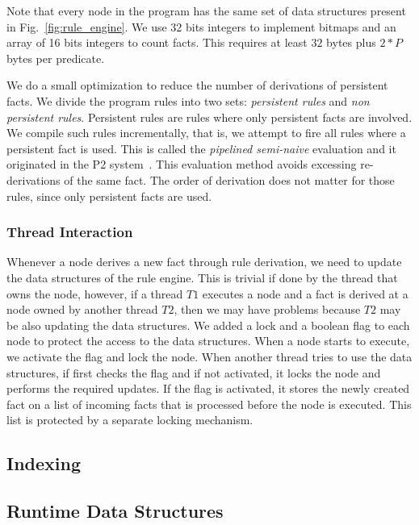 Note that every node in the program has the same set of data structures present in Fig.~\ref{fig:rule_engine}.
We use 32 bits integers to implement bitmaps and an array of 16 bits integers to count facts. This requires
at least $32$ bytes plus $2 * P$ bytes per predicate.

We do a small optimization to reduce the number of derivations of persistent facts. We
divide the program rules into two sets: \emph{persistent rules} and \emph{non persistent rules}.
Persistent rules are rules where only persistent facts are involved. We compile such rules
incrementally, that is, we attempt to fire all rules where a persistent fact is used. This is called
the \emph{pipelined semi-naive} evaluation and it originated in the P2 system~\cite{Loo-condie-garofalakis-p2}.
This evaluation method avoids excessing re-derivations of the same fact. The order of derivation does not matter for those rules, since
only persistent facts are used.

\subsubsection{Thread Interaction}

Whenever a node derives a new fact through rule derivation, we need to update the data structures of the rule engine.
This is trivial if done by the thread that owns the node, however, if a thread $T1$ executes a node and a fact is derived
at a node owned by another thread $T2$, then we may have problems because $T2$ may be also updating the data structures.
We added a lock and a boolean flag to each node to protect the access to the data structures. When a node starts to execute,
we activate the flag and lock the node. When another thread tries to use the data structures, if first checks the flag and if
not activated, it locks the node and performs the required updates. If the flag is activated, it stores the newly created fact
on a list of incoming facts that is processed before the node is executed. This list is protected by a separate locking mechanism.

\subsection{Indexing}\label{indexing}

\subsection{Runtime Data Structures}

